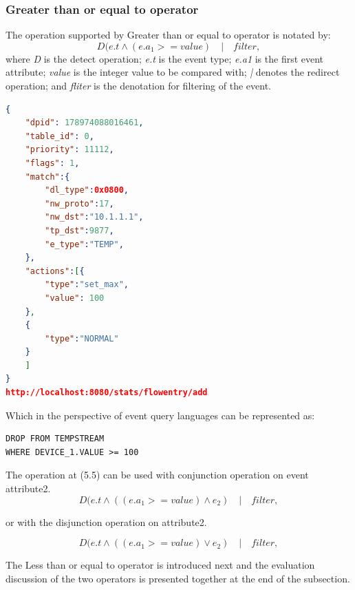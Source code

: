 \subsubsection{Greater than or equal to operator}
The operation supported by Greater than or equal to operator is notated by:
\begin{equation}D(e.t  \wedge (e.a_1 >= value) \quad | \quad filter, \end{equation}
where \textit{D} is the detect operation; \newline
\textit{e.t} is the event type; \newline
\textit{e.a1} is the first event attribute; \newline
\textit{value} is the integer value to be compared with; \newline
\textit{|} denotes the redirect operation; \newline
and \textit{fliter} is the denotation for filtering of the event. \newline \newline
\begin{lstlisting}[language=json,firstnumber=1]
{
	"dpid": 178974088016461,
	"table_id": 0,
	"priority": 11112,
	"flags": 1,
	"match":{
		"dl_type":0x0800,
		"nw_proto":17,
		"nw_dst":"10.1.1.1",
		"tp_dst":9877,
		"e_type":"TEMP",
	},
	"actions":[{
		"type":"set_max",
		"value": 100
	},
	{
		"type":"NORMAL"
	}
	]
}
http://localhost:8080/stats/flowentry/add \end{lstlisting}

Which in the perspective of event query languages can be represented as:

\begin{verbatim}
DROP FROM TEMPSTREAM
WHERE DEVICE_1.VALUE >= 100
\end{verbatim}

The operation at (5.5) can be used with conjunction operation on event attribute2.
\begin{equation}D(e.t  \wedge ((e.a_1 >= value) \wedge e_2 )\quad | \quad filter, \end{equation}

or with the disjunction operation on attribute2.

\begin{equation}D(e.t  \wedge ((e.a_1 >= value) \vee e_2 )\quad | \quad filter, \end{equation}

 The Less than or equal to operator is introduced next and the evaluation discussion of the two operators is presented together at the end of the subsection.

